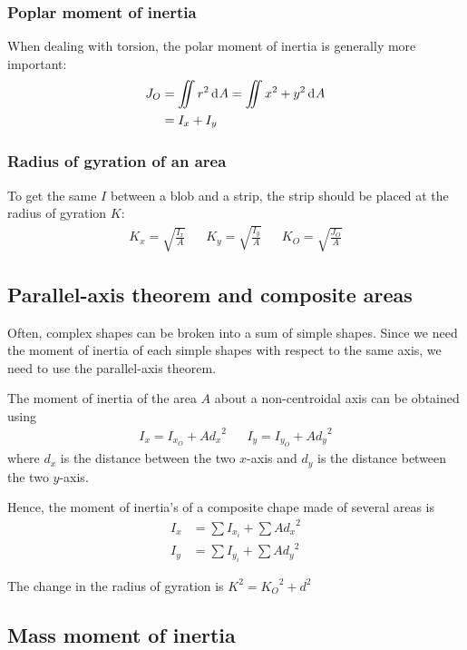 \documentclass[10pt, twocolumn]{article}
\begin{document}
\subsubsection{Poplar moment of inertia}
When dealing with torsion, the polar moment of inertia is generally more important:
\begin{align*}
  J_O & = \iint{r^2 \,\mathrm{d}^{} A} = \iint{x^2 + y^2 \,\mathrm{d}^{} A} \\
      & = I_x + I_y
\end{align*}

\subsubsection{Radius of gyration of an area}
To get the same \(I\) between a blob and a strip, the strip should be placed at the radius of gyration \(K\):
\begin{align*}
  K_x = \sqrt{\frac{I_x}{A}} &  & K_y = \sqrt{\frac{I_y}{A}} &  & K_O = \sqrt{\frac{J_O}{A}}
\end{align*}

\subsection{Parallel-axis theorem and composite areas}
Often, complex shapes can be broken into a sum of simple shapes.
Since we need the moment of inertia of each simple shapes with respect to the same axis, we need to use the parallel-axis theorem.

The moment of inertia of the area \(A\) about a non-centroidal axis can be obtained using
\begin{align*}
  I_x = I_{x_O} + A {d_x}^2 &  & I_y = I_{y_O} + A {d_y}^2
\end{align*}
where \(d_x\) is the distance between the two \(x\)-axis and \(d_y\) is the distance between the two \(y\)-axis.

Hence, the moment of inertia's of a composite chape made of several areas is
\begin{align*}
  I_x & = \sum{I_{x_i}} + \sum{A {d_x}^2} \\
  I_y & = \sum{I_{y_i}} + \sum{A {d_y}^2}
\end{align*}

The change in the radius of gyration is \(K^2 = {K_O}^2 + d^2\)

\subsection{Mass moment of inertia}
\end{document}

